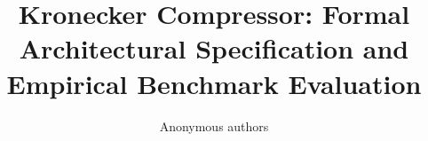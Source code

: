 \title{\textbf{Kronecker Compressor: Formal Architectural Specification and Empirical Benchmark Evaluation}}

\author{Anonymous authors}
